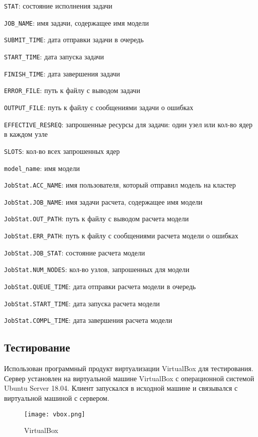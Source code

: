 \lstinline{STAT}: состояние исполнения задачи

\lstinline{JOB_NAME}: имя задачи, содержащее имя модели

\lstinline{SUBMIT_TIME}: дата отправки задачи в очередь

\lstinline{START_TIME}: дата запуска задачи

\lstinline{FINISH_TIME}: дата завершения задачи

\lstinline{ERROR_FILE}: путь к файлу с выводом задачи

\lstinline{OUTPUT_FILE}: путь к файлу с сообщениями задачи о ошибках

\lstinline{EFFECTIVE_RESREQ}: запрошенные ресурсы для задачи: один узел или кол-во ядер в каждом узле

\lstinline{SLOTS}: кол-во всех запрошенных ядер

\lstinline{model_name}: имя модели

\lstinline{JobStat.ACC_NAME}: имя пользователя, который отправил модель на кластер

\lstinline{JobStat.JOB_NAME}: имя задачи расчета, содержащее имя модели

\lstinline{JobStat.OUT_PATH}: путь к файлу с выводом расчета модели

\lstinline{JobStat.ERR_PATH}: путь к файлу с сообщениями расчета модели о ошибках

\lstinline{JobStat.JOB_STAT}: состояние расчета модели

\lstinline{JobStat.NUM_NODES}: кол-во узлов, запрошенных для модели

\lstinline{JobStat.QUEUE_TIME}: дата отправки расчета модели в очередь

\lstinline{JobStat.START_TIME}: дата запуска расчета модели

\lstinline{JobStat.COMPL_TIME}: дата завершения расчета модели

\subsection{Тестирование}

Использован программный продукт виртуализации VirtualBox для тестирования. Сервер установлен на виртуальной машине VirtualBox с операционной системой Ubuntu Server 18.04. Клиент запускался в исходной машине и связывался с виртуальной машиной с сервером.

\begin{figure}[h]
    \centering
    \texttt{[image: vbox.png]}
    \caption{VirtualBox}
\end{figure}

